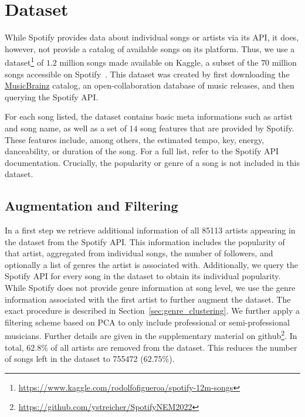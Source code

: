 \documentclass{article}
\begin{document}
\section{Dataset}
\label{sec:dataset}
%
While Spotify provides data about individual songs or artists via its API, it does, however, not provide a catalog of available songs on its platform. Thus, we use a dataset\footnote{\url{https://www.kaggle.com/rodolfofigueroa/spotify-12m-songs}} of $1.2$ million songs made available on Kaggle, a subset of the $70$ million songs accessible on Spotify~\cite{ingham_2020}. This dataset was created by first downloading the \href{https://musicbrainz.org/}{MusicBrainz} catalog, an open-collaboration database of music releases, and then querying the Spotify API. 

For each song listed, the dataset contains basic meta informations such as artist and song name, as well as a set of $14$ song features that are provided by Spotify. These features include, among others, the estimated tempo, key, energy, danceability, or duration of the song. For a full list, refer to the Spotify API documentation. Crucially, the popularity or genre of a song is not included in this dataset.

\subsection{Augmentation and Filtering}
In a first step we retrieve additional information of all \num{85 113} artists appearing in the dataset from the Spotify API. This information includes the popularity of that artist, aggregated from individual songs, the number of followers, and optionally a list of genres the artist is associated with.
%
Additionally, we query the Spotify API for every song in the dataset to obtain its individual popularity. While Spotify does not provide genre information at song level, we use the genre information associated with the first artist to further augment the dataset. The exact procedure is described in Section~\ref{sec:genre_clustering}. 
We further apply a filtering scheme based on PCA to only include professional or semi-professional musicians. Further details are given in the supplementary material on github\footnote{\url{https://github.com/ystreicher/SpotifyNEM2022}}.
In total, $62.8\%$ of all artists are removed from the dataset. This reduces the number of songs left in the dataset to \num{755472} ($62.75\%$).

\end{document}
